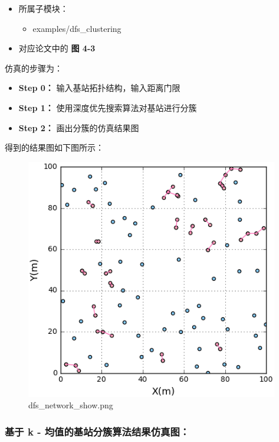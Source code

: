 \documentclass[11pt]{article}
\makeatletter
\def\maxwidth{\ifdim\Gin@nat@width>\linewidth\linewidth
    \else\Gin@nat@width\fi}
\let\Oldincludegraphics\includegraphics
\renewcommand{\includegraphics}[1]{\Oldincludegraphics[width=.8\maxwidth]{#1}}
\providecommand{\tightlist}{%
      \setlength{\itemsep}{0pt}\setlength{\parskip}{0pt}}
\makeatother
\begin{document}
\begin{itemize}
\tightlist
\item
  所属子模块：

  \begin{itemize}
  \tightlist
  \item
    examples/dfs\_clustering
  \end{itemize}
\item
  对应论文中的 \textbf{图 4-3}
\end{itemize}

仿真的步骤为：

\begin{itemize}
\tightlist
\item
  \textbf{Step 0：} 输入基站拓扑结构，输入距离门限
\item
  \textbf{Step 1：} 使用深度优先搜索算法对基站进行分簇
\item
  \textbf{Step 2：} 画出分簇的仿真结果图
\end{itemize}

得到的结果图如下图所示：

\begin{figure}[htbp]
\centering
\includegraphics{dfs_network_show.png}
\caption{dfs\_network\_show.png}
\end{figure}

    \subsubsection{基于 k -
均值的基站分簇算法结果仿真图：}\label{ux57faux4e8e-k---ux5747ux503cux7684ux57faux7ad9ux5206ux7c07ux7b97ux6cd5ux7ed3ux679cux4effux771fux56fe}
\end{document}
